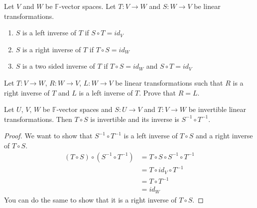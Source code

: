 \begin{definition}
    Let $V$ and $W$ be $\mathbb{F}$-vector spaces. Let $T: V\to W$ and $S: W\to V$ be linear transformations.
    \begin{enumerate}
        \item $S$ is a left inverse of $T$ if $S\circ T=id_V$
        \item $S$ is a right inverse of $T$ if $T\circ S=id_W$
        \item $S$ is a two sided inverse of $T$ if $T\circ S=id_W$ and $S\circ T=id_V$
    \end{enumerate}
\end{definition}
\begin{theorem}
    Let $T:V\to W$, $R: W\to V$, $L: W\to V$ be linear transformations such that $R$ is a right inverse of $T$ and $L$ is a left inverse of $T$. Prove that $R=L$.
\end{theorem}
\begin{theorem}
    Let $U$, $V$, $W$ be $\mathbb{F}$-vector spaces and $S:U\to V$ and $T:V\to W$ be invertible linear transformations. Then $T\circ S$ is invertible and its inverse is $S^{-1}\circ T^{-1}$.
\end{theorem}
\begin{proof}
    We want to show that $S^{-1}\circ T^{-1}$ is a left inverse of $T\circ S$ and a right inverse of $T\circ S$.
    \begin{align*}
        (T\circ S)\circ(S^{-1}\circ T^{-1})&=T\circ S\circ S^{-1}\circ T^{-1}\\
        &=T\circ id_V\circ T^{-1}\\
        &=T\circ T^{-1}\\
        &=id_W
    \end{align*}
    You can do the same to show that it is a right inverse of $T\circ S$.
\end{proof}
